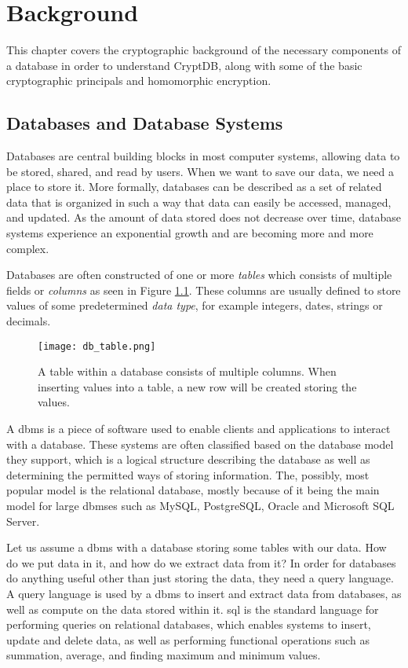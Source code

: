 \chapter{Background}
\label{chp:background}

This chapter covers the cryptographic background of the necessary components of a database in order to understand CryptDB, along with some of the basic cryptographic principals and homomorphic encryption.

\section{Databases and Database Systems}

Databases are central building blocks in most computer systems, allowing data to be stored, shared, and read by users. When we want to save our data, we need a place to store it. More formally, databases can be described as a set of related data that is organized in such a way that data can easily be accessed, managed, and updated. As the amount of data stored does not decrease over time, database systems experience an exponential growth and are becoming more and more complex.

Databases are often constructed of one or more \emph{tables} which consists of multiple fields or \emph{columns} as seen in Figure \ref{fig:db_table}. These columns are usually defined to store values of some predetermined \emph{data type}, for example integers, dates, strings or decimals. 

\begin{figure}[h]
	\centering
	\texttt{[image: db\_table.png]}
	\caption{A table within a database consists of multiple columns. When inserting values into a table, a new row will be created storing the values.}
	\label{fig:db_table}
\end{figure}

A \gls{dbms} is a piece of software used to enable clients and applications to interact with a database. These systems are often classified based on the database model they support, which is a logical structure describing the database as well as determining the permitted ways of storing information. The, possibly, most popular model is the relational database, mostly because of it being the main model for large \gls{dbms}es such as MySQL, PostgreSQL, Oracle and Microsoft SQL Server.

Let us assume a \gls{dbms} with a database storing some tables with our data. How do we put data in it, and how do we extract data from it? In order for databases do anything useful other than just storing the data, they need a query language. A query language is used by a \gls{dbms} to insert and extract data from databases, as well as compute on the data stored within it. \gls{sql} is the standard language for performing queries on relational databases, which enables systems to insert, update and delete data, as well as performing functional operations such as summation, average, and finding maximum and minimum values.


